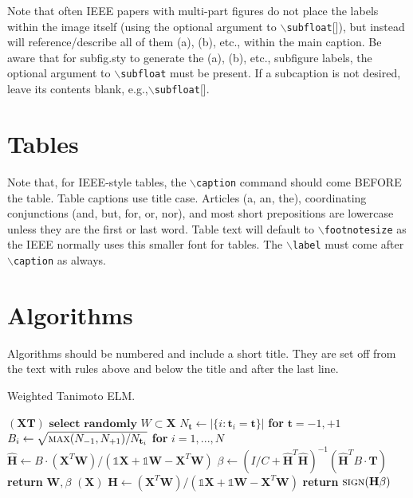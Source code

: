 \documentclass[lettersize,journal]{IEEEtran}
\begin{document}
Note that often IEEE papers with multi-part figures do not place the labels within the image itself (using the optional argument to $\backslash${\tt{subfloat}}[]), but instead will
 reference/describe all of them (a), (b), etc., within the main caption.
 Be aware that for subfig.sty to generate the (a), (b), etc., subfigure
 labels, the optional argument to $\backslash${\tt{subfloat}} must be present. If a
 subcaption is not desired, leave its contents blank,
 e.g.,$\backslash${\tt{subfloat}}[].


 

\section{Tables}
Note that, for IEEE-style tables, the
 $\backslash${\tt{caption}} command should come BEFORE the table. Table captions use title case. Articles (a, an, the), coordinating conjunctions (and, but, for, or, nor), and most short prepositions are lowercase unless they are the first or last word. Table text will default to $\backslash${\tt{footnotesize}} as
 the IEEE normally uses this smaller font for tables.
 The $\backslash${\tt{label}} must come after $\backslash${\tt{caption}} as always.


\section{Algorithms}
Algorithms should be numbered and include a short title. They are set off from the text with rules above and below the title and after the last line.

\begin{algorithm}[H]
\caption{Weighted Tanimoto ELM.}\label{alg:alg1}
\begin{algorithmic}
\STATE 
{}$(\mathbf{X} \mathbf{T})$
\STATE \hspace{0.5cm}$ \textbf{select randomly } W \subset \mathbf{X}  $
\STATE \hspace{0.5cm}$ N_\mathbf{t} \gets | \{ i : \mathbf{t}_i = \mathbf{t} \} | $ \textbf{ for } $ \mathbf{t}= -1,+1 $
\STATE \hspace{0.5cm}$ B_i \gets \sqrt{ \textsc{max}(N_{-1},N_{+1}) / N_{\mathbf{t}_i} } $ \textbf{ for } $ i = 1,...,N $
\STATE \hspace{0.5cm}$ \hat{\mathbf{H}} \gets  B \cdot (\mathbf{X}^T\textbf{W})/( \mathbb{1}\mathbf{X} + \mathbb{1}\textbf{W} - \mathbf{X}^T\textbf{W} ) $
\STATE \hspace{0.5cm}$ \beta \gets \left ( I/C + \hat{\mathbf{H}}^T\hat{\mathbf{H}} \right )^{-1}(\hat{\mathbf{H}}^T B\cdot \mathbf{T})  $
\STATE \hspace{0.5cm}\textbf{return}  $\textbf{W},  \beta $
\STATE 
{}$(\mathbf{X} )$
\STATE \hspace{0.5cm}$ \mathbf{H} \gets  (\mathbf{X}^T\textbf{W} )/( \mathbb{1}\mathbf{X}  + \mathbb{1}\textbf{W}- \mathbf{X}^T\textbf{W}  ) $
\STATE \hspace{0.5cm}\textbf{return}  $\textsc{sign}( \mathbf{H} \beta )$
\end{algorithmic}
\label{alg1}
\end{algorithm}
\end{document}
